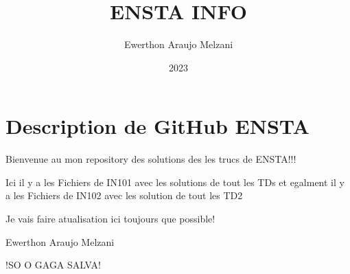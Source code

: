 \documentclass{article}
\title{ENSTA INFO}
\author{Ewerthon Araujo Melzani}
\date{2023}
\begin{document}
\maketitle

\section*{Description de GitHub ENSTA}

\vspace*{1.5 cm}

Bienvenue au mon repository des solutions des les trucs de ENSTA!!!


\vspace*{1.5 cm}



Ici il y a les Fichiers de IN101 avec les solutions de tout les TDs et egalment il y a les Fichiers de IN102 avec les solution de tout les TD2 


\vspace*{1.5 cm}



Je vais faire atualisation ici toujours que possible!


\vspace*{1.5 cm}



\LARGE{Ewerthon Araujo Melzani}

\vspace*{1.5 cm}

\huge{!SO O GAGA SALVA!}
\end{document}
